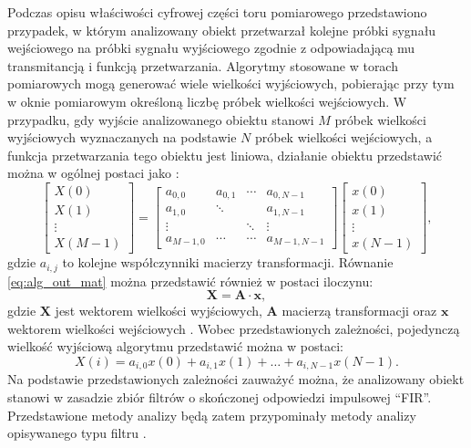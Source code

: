 Podczas opisu właściwości cyfrowej części toru pomiarowego przedstawiono przypadek, w którym analizowany obiekt przetwarzał kolejne próbki sygnału wejściowego na próbki sygnału wyjściowego zgodnie z odpowiadającą mu transmitancją i funkcją przetwarzania. Algorytmy stosowane w torach pomiarowych mogą generować wiele wielkości wyjściowych, pobierając przy tym w oknie pomiarowym określoną liczbę próbek wielkości wejściowych. W przypadku, gdy wyjście analizowanego obiektu stanowi $M$ próbek wielkości wyjściowych wyznaczanych na podstawie $N$ próbek wielkości wejściowych, a funkcja przetwarzania tego obiektu jest liniowa, działanie obiektu przedstawić można w ogólnej postaci jako \cite{jakubiec_algorithms, jakubiec_single}:
\begin{equation}
\begin{bmatrix}
X \left( 0 \right)   \\
X \left( 1 \right)   \\
\vdots               \\
X \left( M-1 \right)
\end{bmatrix}
=
\begin{bmatrix}
a_{0, 0}   &   a_{0, 1} &   \cdots   &   a_{0, N-1}      \\
a_{1, 0}   &   \ddots   &            &   a_{1, N-1}      \\
\vdots     &            &   \ddots   &   \vdots          \\
a_{M-1, 0} &   \cdots   &   \cdots   &   a_{M-1, N-1}
\end{bmatrix}
\begin{bmatrix}
x \left( 0 \right)   \\
x \left( 1 \right)   \\
\vdots               \\
x \left( N-1 \right)
\end{bmatrix}
\label{eq:alg_out_mat},
\end{equation}
gdzie $a_{i,j}$ to kolejne współczynniki macierzy transformacji. Równanie \eqref{eq:alg_out_mat} można przedstawić również w postaci iloczynu:
\begin{equation}
\mathbf{X} = \mathbf{A} \cdot \mathbf{x} \label{eq:alg_out_mul},
\end{equation}
gdzie $\mathbf{X}$ jest wektorem wielkości wyjściowych, $\mathbf{A}$ macierzą transformacji oraz $\mathbf{x}$ wektorem wielkości wejściowych \cite{jakubiec_algorithms}. Wobec przedstawionych zależności, pojedynczą wielkość wyjściową algorytmu przedstawić można w postaci:
\begin{equation}
X \left( i \right) = a_{i, 0} x \left( 0 \right) + a_{i, 1} x \left( 1 \right) + \hdots + a_{i, N-1} x \left( N-1 \right) \label{eq:alg_out_single}.
\end{equation}
Na podstawie przedstawionych zależności zauważyć można, że analizowany obiekt stanowi w zasadzie zbiór filtrów o skończonej odpowiedzi impulsowej \enquote{FIR}. Przedstawione metody analizy będą zatem przypominały metody analizy opisywanego typu filtru \cite{mehrnia_fir}.

